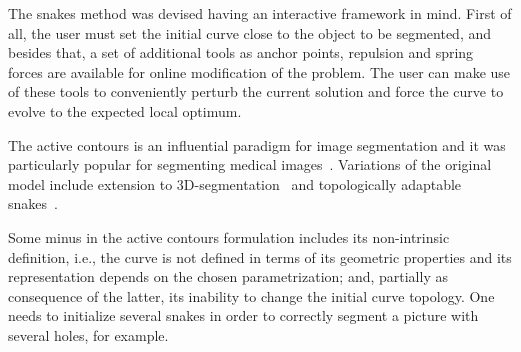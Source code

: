 The snakes method was devised having an interactive framework in mind. First of all, the user must set the initial curve close to the object to be segmented, and besides that, a set of additional tools as anchor points, repulsion and spring forces are available for online modification of the problem. The user can make use of these tools to conveniently perturb the current solution and force the curve to evolve to the expected local optimum.

The active contours is an influential paradigm for image segmentation and it was particularly popular for segmenting medical images~\cite{mcinerney99}. Variations of the original model include extension to 3D-segmentation~\cite{mcinemey99} and topologically adaptable snakes~\cite{mcinerney95}.

Some minus in the active contours formulation includes its non-intrinsic definition, i.e., the curve is not defined in terms of its geometric properties and its representation depends on the chosen parametrization; and, partially as consequence of the latter, its inability to change the initial curve topology. One needs to initialize several snakes in order to correctly segment a picture with several holes, for example. 



 
 

